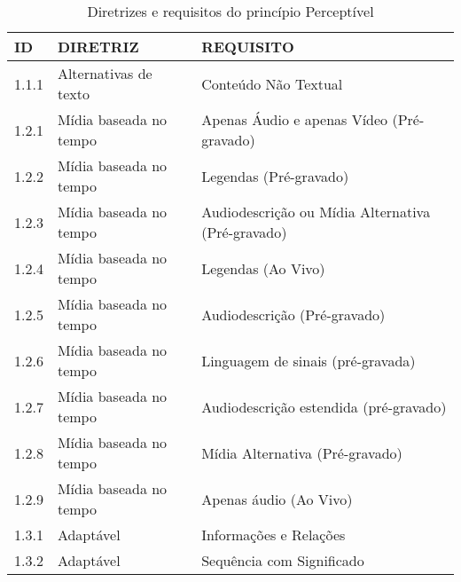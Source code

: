 \begin{table}[]
\center
\caption{Diretrizes e requisitos do princípio Perceptível}
\label{tab:perceptivel}
\begin{tabular}{lll}
\textbf{ID} & \textbf{DIRETRIZ}      & \textbf{REQUISITO}   \\
\hline
 1.1.1           & Alternativas de texto  & Conteúdo Não Textual                                                                 \\
 1.2.1           & Mídia baseada no tempo & Apenas Áudio e apenas Vídeo (Pré-gravado)                                            \\
 
 1.2.2           & Mídia baseada no tempo & Legendas (Pré-gravado)                                                               \\
 
 1.2.3           & Mídia baseada no tempo & Audiodescrição ou Mídia Alternativa (Pré-gravado)                                    \\
 
 1.2.4           & Mídia baseada no tempo & Legendas (Ao Vivo)                                                                  \\
 
 1.2.5           & Mídia baseada no tempo & Audiodescrição (Pré-gravado)                                                        \\
 
 1.2.6           & Mídia baseada no tempo & Linguagem de sinais (pré-gravada)                                                   \\
 
 1.2.7           & Mídia baseada no tempo & Audiodescrição estendida (pré-gravado)                                              \\
 
 1.2.8           & Mídia baseada no tempo & Mídia Alternativa (Pré-gravado)                                                     \\
 
 1.2.9           & Mídia baseada no tempo & Apenas áudio (Ao Vivo)                    \\
 
 1.3.1           & Adaptável              & Informações e Relações                                                               \\
 
 1.3.2           & Adaptável              & Sequência com Significado                                                            \\
 

\end{tabular}
\end{table}

